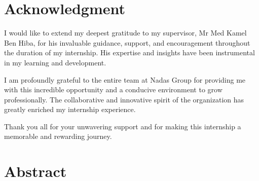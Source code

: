 \documentclass[12pt,a4paper]{report}
\begin{document}
\chapter*{Acknowledgment}

I would like to extend my deepest gratitude to my supervisor, Mr Med Kamel Ben Hiba, for his invaluable guidance, support, and encouragement throughout the duration of my internship. His expertise and insights have been instrumental in my learning and development.

I am profoundly grateful to the entire team at Nadas Group for providing me with this incredible opportunity and a conducive environment to grow professionally. The collaborative and innovative spirit of the organization has greatly enriched my internship experience.

Thank you all for your unwavering support and for making this internship a memorable and rewarding journey.

\clearpage

\chapter*{Abstract}
\end{document}

